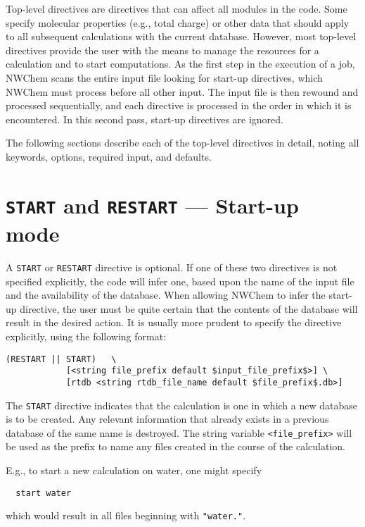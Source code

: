 \label{sec:toplevel}

Top-level directives are directives that can affect all modules in the
code.  Some specify molecular properties (e.g., total charge) or other
data that should apply to all subsequent calculations with the current
database.  However, most top-level directives provide the user with
the means to manage the resources for a calculation and to start
computations.  As the first step in the execution of a job, NWChem
scans the entire input file looking for start-up directives, which
NWChem must process before all other input.  The input file is then
rewound and processed sequentially, and each directive is processed in
the order in which it is encountered.  In this second pass, start-up
directives are ignored.

The following sections describe each of the top-level directives in
detail, noting all keywords, options, required input, and defaults.

\section{{\tt START} and {\tt RESTART} --- Start-up mode}
\label{sec:start}

A {\tt START} or {\tt RESTART} directive is
optional.  If one of these two directives is not specified
explicitly, the code will infer one, based upon the name of the
input file and the availability of the database.  When allowing NWChem
to infer the start-up directive, the user must be quite certain that
the contents of the database will result in the desired action.  It
is usually more prudent to specify the directive explicitly, using the
following format:

\begin{verbatim}
(RESTART || START)   \
            [<string file_prefix default $input_file_prefix$>] \
            [rtdb <string rtdb_file_name default $file_prefix$.db>]
\end{verbatim}

The \verb+START+ directive indicates that the calculation is one in
which a new database is to be created.  Any relevant information that
already exists in a previous database of the same name is destroyed.
The string variable {\tt <file\_prefix>} will be used as the prefix to
name any files created in the course of the calculation.  

E.g., to start a new calculation on water, one might specify
\begin{verbatim}
  start water
\end{verbatim}
which would result in all files beginning with {\tt "water."}.

